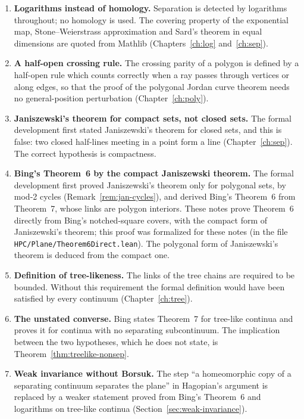 \begin{enumerate}
\item \textbf{Logarithms instead of homology.} Separation is detected by logarithms throughout; no
homology is used. The covering property
of the exponential map, Stone--Weierstrass approximation and Sard's theorem in equal dimensions are
quoted from Mathlib (Chapters~\ref{ch:log} and~\ref{ch:sep}).
\item \textbf{A half-open crossing rule.} The crossing parity of a polygon is defined by a half-open
rule which counts correctly when a ray passes through vertices or along edges, so that the proof of
the polygonal Jordan curve theorem needs no general-position perturbation (Chapter~\ref{ch:poly}).
\item \textbf{Janiszewski's theorem for compact sets, not closed sets.} The formal development
first stated Janiszewski's theorem for closed sets, and this is false: two closed half-lines
meeting in a point form a line (Chapter~\ref{ch:sep}). The correct hypothesis is compactness.
\item \textbf{Bing's Theorem~6 by the compact Janiszewski theorem.} The formal development first
proved Janiszewski's theorem only for polygonal sets, by mod-2 cycles (Remark~\ref{rem:jan-cycles}),
and derived Bing's Theorem~6 from Theorem~7, whose links are polygon interiors. These notes prove
Theorem~6 directly from Bing's notched-square covers, with the compact form of Janiszewski's
theorem; this proof was formalized for these notes (in the file
\texttt{HPC/Plane/Theorem6Direct.lean}). The polygonal form of Janiszewski's theorem is deduced from
the compact one.
\item \textbf{Definition of tree-likeness.} The links of the tree chains are required to be bounded.
Without this requirement the formal definition would have been satisfied by every continuum
(Chapter~\ref{ch:tree}).
\item \textbf{The unstated converse.} Bing states Theorem~7 for tree-like continua and proves it for
continua with no separating subcontinuum. The implication between the two hypotheses, which he
does not state, is Theorem~\ref{thm:treelike-nonsep}.
\item \textbf{Weak invariance without Borsuk.} The step ``a homeomorphic copy of a separating
continuum separates the plane'' in Hagopian's argument is replaced by a weaker statement proved from
Bing's Theorem~6 and logarithms on tree-like continua (Section~\ref{sec:weak-invariance}).
\end{enumerate}

